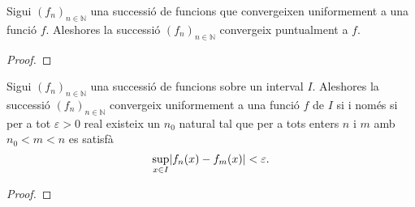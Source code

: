 \documentclass[../Apunts.tex]{subfiles}
\begin{document}
	\begin{proposition}
		\label{prop:una successió de funcions convergeix uniformement a una funció a la que convergeixi puntualment}
		Sigui \((f_{n})_{n\in\mathbb{N}}\) una successió de funcions que convergeixen uniformement a una funció \(f\). Aleshores la successió \((f_{n})_{n\in\mathbb{N}}\) convergeix puntualment a \(f\).
		\begin{proof}
		\end{proof}
	\end{proposition}
	\begin{theorem}
		\label{thm:condició de Cauchy per successions de funcions}
		Sigui \((f_{n})_{n\in\mathbb{N}}\) una successió de funcions sobre un interval \(I\). Aleshores la successió \((f_{n})_{n\in\mathbb{N}}\) convergeix uniformement a una funció \(f\) de \(I\) si i només si per a tot \(\varepsilon>0\) real existeix un \(n_{0}\) natural tal que per a tots enters \(n\) i \(m\) amb \(n_{0}<m<n\) es satisfà
		\[\sup_{x\in I}\abs{f_{n}(x)-f_{m}(x)}<\varepsilon.\]
		\begin{proof}
		\end{proof}
	\end{theorem}
\end{document}
